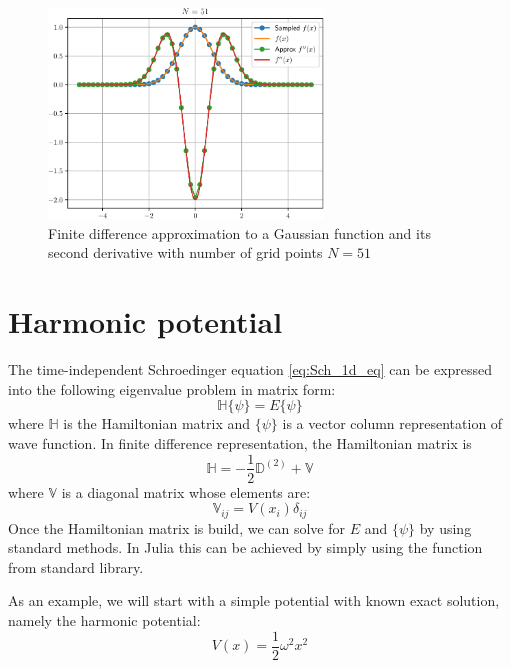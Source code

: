 \begin{figure}[H]
{\center
\includegraphics[width=0.65\textwidth]{../codes/FD1d/IMG_gaussian_51.pdf}
\par}
\caption{Finite difference approximation to a Gaussian function and its second derivative with
number of grid points $N=51$}
\end{figure}


\section{Harmonic potential}

The time-independent Schroedinger equation \eqref{eq:Sch_1d_eq} can be expressed into
the following eigenvalue problem in matrix form:
\begin{equation}
\mathbb{H}\{ \psi \} = E \{ \psi \}
\end{equation}
where $\mathbb{H}$ is the Hamiltonian matrix and $\{ \psi \}$ is a vector
column representation of wave function.
In finite difference representation, the Hamiltonian matrix is
\begin{equation}
\mathbb{H} = -\frac{1}{2}\mathbb{D}^{(2)} + \mathbb{V}
\end{equation}
where $\mathbb{V}$ is a diagonal matrix whose elements are:
\begin{equation}
\mathbb{V}_{ij} = V(x_{i})\delta_{ij}
\end{equation}
Once the Hamiltonian matrix is build, we can solve for $E$ and $\{\psi\}$ by using standard
methods. In Julia this can be achieved by simply using the  function
from  standard library.

As an example, we will start with a simple potential with known exact solution,
namely the harmonic potential:
\begin{equation}
V(x) = \frac{1}{2}\omega^2 x^2
\end{equation}


